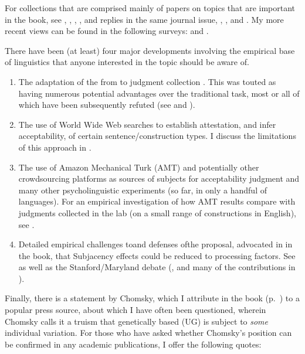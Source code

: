 \begin{refsection}
For collections that are comprised mainly of papers on topics that are important in the book, see \citet{McNair1996}, \citet{Penke2004}, \citet{Kepser2005}, \citet{Borsley2005}, \citet{Featherston2007} and replies in the same journal issue, \citet{Featherston2007a}, \citet{Featherston2009}, and \citet{Winkler2009}. My more recent views can be found in the following surveys: \citet{Schuetze2006,Schuetze2011} and \citet{Schuetze2013}.

There have been (at least) four major developments involving the empirical base of linguistics that anyone interested in the topic should be aware of. 
    
\begin{enumerate}
\item The adaptation of the  from  to judgment collection \citep{BardEtAl1996}. This was touted as having numerous potential advantages over the traditional  task, most or all of which have been subsequently refuted (see \citealt{Weskott2011} and \citealt{Sprouse2013}). 
\item The use of World Wide Web searches to establish attestation, and infer acceptability, of certain sentence/construction types. I discuss the limitations of this approach in \citet{Schuetze2009}.
\item The use of Amazon Mechanical Turk (AMT) and potentially other crowdsourcing platforms as sources of subjects for acceptability judgment and many other psycholinguistic experiments (so far, in only a handful of languages). For an empirical investigation of how AMT results compare with judgments collected in the lab (on a small range of constructions in English), see \citet{Sprouse2011}.
\item Detailed empirical challenges to\schdash{}and defenses of\schdash{}the proposal, advocated in  in the book, that Subjacency effects could be reduced to processing factors. See \citet{Yoshida2014} as well as the Stanford\slash Maryland debate (\citet{Hofmeister2010,Hofmeister2012,Hofmeister2012a,Sprouse2012,Sprouse2012a}, and many of the contributions in \citealt{Sprouse2014}).
\end{enumerate}
 
Finally, there is a statement by Chomsky, which I attribute in the book (p.~\pageref{ChomskyPrefacestart}) to a popular press source, about which I have often been questioned, wherein Chomsky calls it a truism that genetically based  (UG) is subject to \textit{some} individual variation. For those who have asked whether Chomsky’s position can be confirmed in any academic publications, I offer the following quotes:


\end{refsection}
